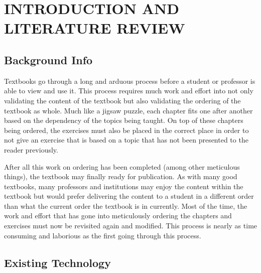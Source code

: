 %
%
%
%


\pagestyle{plain} %

\chapter{INTRODUCTION AND LITERATURE REVIEW}

\section{Background Info}

Textbooks go through a long and arduous process before a student or professor is able to view and use it. This process requires much work and effort into not only validating the content of the textbook but also validating the ordering of the textbook as whole. Much like a jigsaw puzzle, each chapter fits one after another based on the dependency of the topics being taught. On top of these chapters being ordered, the exercises must also be placed in the correct place in order to not give an exercise that is based on a topic that has not been presented to the reader previously.

After all this work on ordering has been completed (among other meticulous things), the textbook may finally ready for publication. As with many good textbooks, many professors and institutions may enjoy the content within the textbook but would prefer delivering the content to a student in a different order than what the current order the textbook is in currently. Most of the time, the work and effort that has gone into meticulously ordering the chapters and exercises must now be revisited again and modified. This process is nearly as time consuming and laborious as the first going through this process.

\section{Existing Technology}

